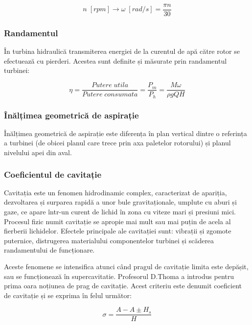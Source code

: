 \begin{equation}
n\; [\si{rpm}]\rightarrow{\omega}\; [\si{rad/s}]=\frac{{\pi}n}{30}
\end{equation}


\subsubsection{Randamentul}

În turbina hidraulică transmiterea energiei de la curentul de apă către rotor se efectuează cu pierderi. Acestea sunt definite și măsurate prin randamentul turbinei:

\begin{equation}
{\eta}=\frac{Putere\; utila}{Putere\; consumata}=\frac{P_m}{P_h}=\frac{M{\omega}}{{\rho}gQH}
\end{equation}


\subsubsection{Înălțimea geometrică de aspirație}

Înălțimea geometrică de aspirație este diferența în plan vertical dintre o referința a turbinei (de obicei planul care trece prin axa paletelor rotorului) și planul nivelului apei din aval.

\subsubsection{Coeficientul de cavitație}

Cavitația este un fenomen hidrodinamic complex, caracterizat de apariția, dezvoltarea și surparea rapidă a unor bule gravitaționale, umplute cu aburi și gaze, ce apare într-un curent de lichid în zona cu viteze mari și presiuni mici. Procesul fizic numit cavitație se apropie mai mult sau mai puțin de acela al fierberii lichidelor. Efectele principale ale cavitației sunt: vibrații și zgomote puternice, distrugerea materialului componentelor turbinei și scăderea randamentului de funcționare.

Aceste fenomene se intensifica atunci când pragul de cavitație limita este depășit, sau se funcționează în supercavitatie. Profesorul D.Thoma a introdus pentru prima oara noțiunea de prag de cavitație. Acest criteriu este denumit coeficient de cavitație și se exprima în felul următor:

\begin{equation}
\sigma=\frac{A-A\pm{H_s}}{H}
\end{equation}


